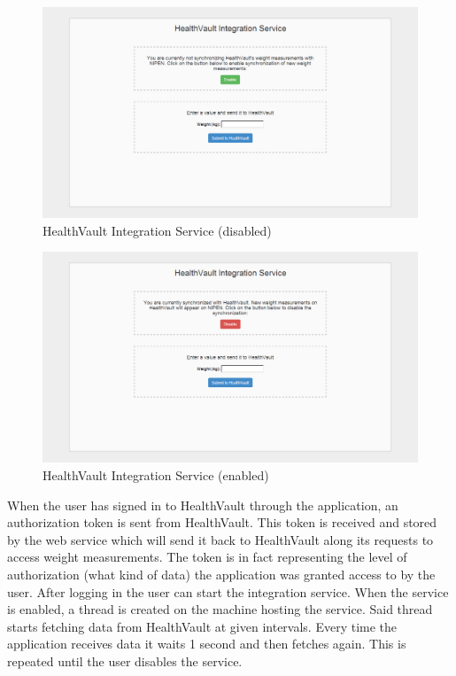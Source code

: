 \begin{figure}[H]
\centering
\includegraphics[scale=0.4]{../Figures/webservice-not-polling.png}
\caption{HealthVault Integration Service (disabled)}
\label{figure:webservice-not-polling}
\end{figure}

\begin{figure}[H]
\centering
\includegraphics[scale=0.4]{../Figures/webservice-polling.png}
\caption{HealthVault Integration Service (enabled)}
\label{figure:webservice-polling}
\end{figure}

When the user has signed in to HealthVault through the application, an authorization token
is sent from HealthVault. This token is received and stored by the web service which
will send it back to HealthVault along its requests to access weight measurements.
The token is in fact representing the level of authorization (what kind of data) the application
was granted access to by the user.
After logging in the user can start the integration service.
When the service is enabled, a thread is created on the machine hosting the service.
Said thread starts fetching data from HealthVault at given intervals.
Every time the application receives data it waits 1 second and then fetches again.
This is repeated until the user disables the service.

